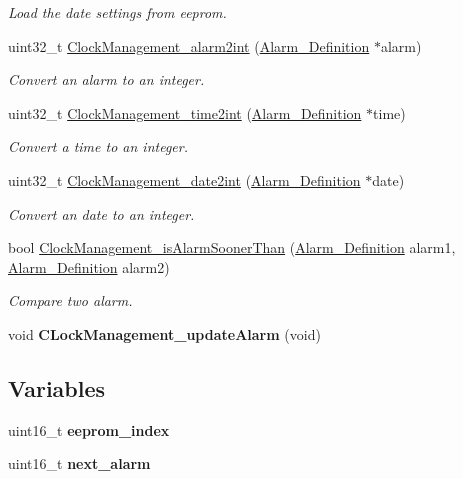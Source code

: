 \begin{DoxyCompactItemize}
\begin{DoxyCompactList}\small\item\em Load the date settings from eeprom. \end{DoxyCompactList}\item 
uint32\+\_\+t \hyperlink{group___clock___management_ga6e567ef31c1220b3440ca3f726f86d10}{Clock\+Management\+\_\+alarm2int} (\hyperlink{struct_alarm___definition}{Alarm\+\_\+\+Definition} $\ast$alarm)
\begin{DoxyCompactList}\small\item\em Convert an alarm to an integer. \end{DoxyCompactList}\item 
uint32\+\_\+t \hyperlink{group___clock___management_ga36a1b1fbb98de2b2b73ccb40e87e4518}{Clock\+Management\+\_\+time2int} (\hyperlink{struct_alarm___definition}{Alarm\+\_\+\+Definition} $\ast$time)
\begin{DoxyCompactList}\small\item\em Convert a time to an integer. \end{DoxyCompactList}\item 
uint32\+\_\+t \hyperlink{group___clock___management_ga9e3b465b980b97aa4477ac3574b5cfba}{Clock\+Management\+\_\+date2int} (\hyperlink{struct_alarm___definition}{Alarm\+\_\+\+Definition} $\ast$date)
\begin{DoxyCompactList}\small\item\em Convert an date to an integer. \end{DoxyCompactList}\item 
bool \hyperlink{group___clock___management_ga20358c9f73302a285a8f084823e8eb2f}{Clock\+Management\+\_\+is\+Alarm\+Sooner\+Than} (\hyperlink{struct_alarm___definition}{Alarm\+\_\+\+Definition} alarm1, \hyperlink{struct_alarm___definition}{Alarm\+\_\+\+Definition} alarm2)
\begin{DoxyCompactList}\small\item\em Compare two alarm. \end{DoxyCompactList}\item 
\mbox{\label{group___clock___management_gab3193e7c0f26b76a48829295caf4888f}} 
void {\bfseries C\+Lock\+Management\+\_\+update\+Alarm} (void)
\end{DoxyCompactItemize}
\subsection*{Variables}
\begin{DoxyCompactItemize}
\item 
\mbox{\label{group___clock___management_gadafaa69421576ac611d507121be2e8f2}} 
uint16\+\_\+t {\bfseries eeprom\+\_\+index}
\item 
\mbox{\label{group___clock___management_gaae2a6d57125e1b394a897958b141986b}} 
uint16\+\_\+t {\bfseries next\+\_\+alarm}
\end{DoxyCompactItemize}


